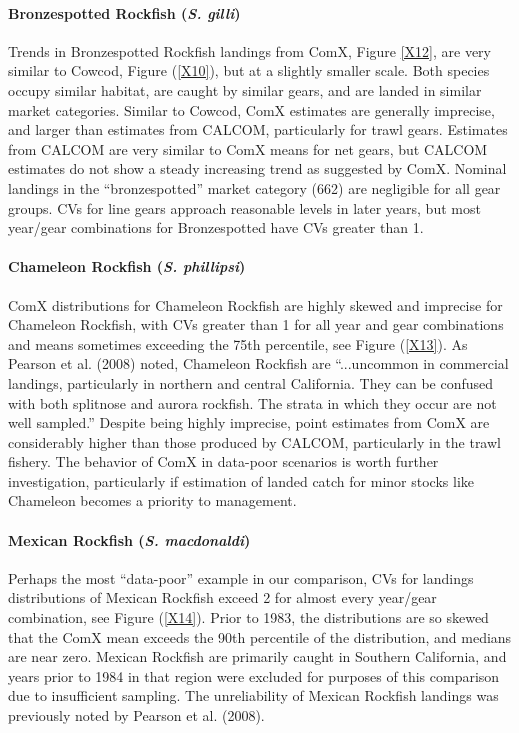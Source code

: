 \documentclass[12pt]{article}
\begin{document}
\paragraph{Bronzespotted Rockfish (\textit{S. gilli})}

Trends in Bronzespotted Rockfish landings from ComX, Figure \ref{X12}, are very 
similar to Cowcod, Figure (\ref{X10}), but at a slightly smaller scale. Both 
species occupy similar habitat, are caught by similar gears, and are landed in 
similar market categories. Similar to Cowcod, ComX estimates are generally 
imprecise, and larger than estimates from CALCOM, particularly for trawl 
gears. Estimates from CALCOM are very similar to ComX means for net gears, but 
CALCOM estimates do not show a steady increasing trend as suggested by ComX. 
Nominal landings in the ``bronzespotted'' market category (662) are negligible 
for all gear groups. CVs for line gears approach reasonable levels in later 
years, but most year/gear combinations for Bronzespotted have CVs greater than 
1.

\paragraph{Chameleon Rockfish (\textit{S. phillipsi})}

ComX distributions for Chameleon Rockfish are highly skewed and imprecise for 
Chameleon Rockfish, with CVs greater than 1 for all year and gear combinations 
and means sometimes exceeding the 75th percentile, see Figure (\ref{X13}). As 
Pearson et al. (2008) noted, Chameleon Rockfish are ``...uncommon in commercial 
landings, particularly in northern and central California. They can be 
confused with both splitnose and aurora rockfish. The strata in which they 
occur are not well sampled.'' Despite being highly imprecise, point estimates 
from ComX are considerably higher than those produced by CALCOM, particularly 
in the trawl fishery. The behavior of ComX in data-poor scenarios is worth 
further investigation, particularly if estimation of landed catch for minor 
stocks like Chameleon becomes a priority to management.

\paragraph{Mexican Rockfish (\textit{S. macdonaldi})}

Perhaps the most ``data-poor'' example in our comparison, CVs for landings 
distributions of Mexican Rockfish exceed 2 for almost every year/gear 
combination, see Figure (\ref{X14}). Prior to 1983, the distributions are so 
skewed that the ComX mean exceeds the 90th percentile of the distribution, and 
medians are near zero. Mexican Rockfish are primarily caught in Southern 
California, and years prior to 1984 in that region were excluded for purposes 
of this comparison due to insufficient sampling. The unreliability of Mexican 
Rockfish landings was previously noted by Pearson et al. (2008).
\end{document}
